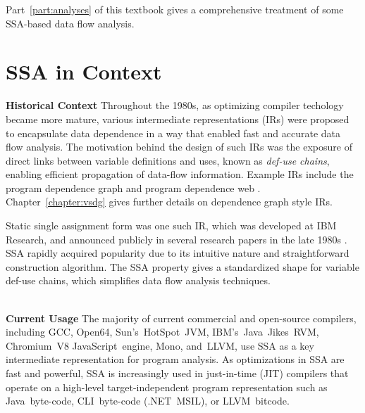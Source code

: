 Part~\ref{part:analyses} of this textbook gives a comprehensive treatment of 
some SSA-based data flow analysis.






\section{SSA in Context}




\textbf{Historical Context }
Throughout the 1980s, as optimizing compiler
techology became more mature, various intermediate
representations (IRs) were proposed to encapsulate data
dependence in a way that enabled fast and accurate
data flow analysis.
The motivation behind the design of
such IRs was the exposure of direct links between variable
definitions and uses, known as \textit{def-use chains},
enabling efficient propagation of data-flow information.
Example IRs include the program dependence graph \cite{ferrante87program}
and program dependence web \cite{ottenstein90program}.
Chapter~\ref{chapter:vsdg} gives further details on dependence graph
style IRs.


Static single assignment form was one such IR, 
which was developed at IBM Research, and announced publicly
in several research papers in the late 1980s
\cite{rosen88global,alpern88detecting,cytron89efficient}.
SSA rapidly acquired popularity due to its 
intuitive nature and straightforward
construction algorithm.
The SSA property gives a 
standardized shape for variable def-use chains,
which simplifies data flow analysis techniques.

~\\
\textbf{Current Usage }
The majority of current commercial and open-source compilers, including  GCC, Open64, Sun's~HotSpot~JVM, IBM's~Java~Jikes~RVM, Chromium~V8 JavaScript~engine, Mono, and~LLVM,
use SSA as a key intermediate representation for
program analysis.
As optimizations in SSA are fast and powerful, SSA is increasingly used in
just-in-time (JIT) compilers that operate on a high-level target-independent
program representation such as Java~byte-code, CLI~byte-code (.NET~MSIL), or
LLVM~bitcode.

